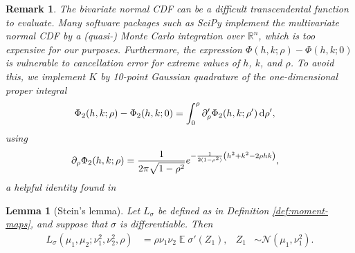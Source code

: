 \documentclass{article}
\newtheorem{remark}{Remark}
\newtheorem{lemma}{Lemma}
\DeclareMathOperator{\expect}{\mathbb{E}}
\begin{document}
\begin{remark}
  The bivariate normal CDF can be a difficult transcendental function
  to evaluate.
  Many software packages such as SciPy \citep{wagner_kalman_2022}
  implement the multivariate normal CDF by a (quasi-) Monte Carlo
  integration over \(\mathbb{R}^n\), which is too expensive for our purposes.
  Furthermore, the expression \(\Phi(h, k; \rho) - \Phi(h, k; 0)\) is
  vulnerable to cancellation error for extreme values of \(h\),
  \(k\), and \(\rho\).
  To avoid this, we implement \(K\) by 10-point Gaussian quadrature
  of the one-dimensional proper integral
  \begin{align*}
    \Phi_2(h, k; \rho) -
    \Phi_2(h, k; 0)
    &= \int_0^\rho \partial_\rho' \Phi_2(h, k; \rho') \dif\rho',
  \end{align*}
  using
  \begin{align*}
    \partial_\rho \Phi_2(h, k; \rho)
    &= \frac{1}{2\pi \sqrt{1 - \rho^2}} e^{-\frac{1}{2(1 - \rho^2)}
    \del{h^2 + k^2 - 2 \rho h k}},
  \end{align*}
  a helpful identity found in \citet{drezner_computation_1990}
\end{remark}


\begin{lemma}[Stein's lemma]
  \label{lem:stein}
  Let \(L_\sigma\) be defined as in Definition \ref{def:moment-maps}, and suppose that \(\sigma\) is differentiable.
  Then
  \begin{align*}
    L_\sigma(\mu_1, \mu_2; \nu_1^2, \nu_2^2, \rho) &= \rho
    \nu_1 \nu_2 \expect \sigma'(Z_1),
    & Z_1 &\sim \mathcal N(\mu_1, \nu^2_1).
  \end{align*}
\end{lemma}
\end{document}
